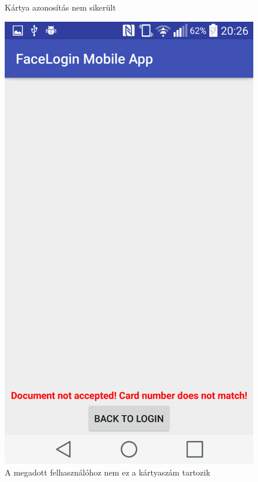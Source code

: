 \begin{figure}[h]
\begin{minipage}{.30\textwidth}
    \caption{Kártya azonosítás nem sikerült}
 \end{minipage}
 \begin{minipage}{.30\textwidth} 
\centering
     \includegraphics[scale=0.10]{img/card_number_does_not_match}
     \caption{A megadott felhasználóhoz nem ez a kártyaszám tartozik}
 \end{minipage}
 \begin{minipage}{.30\textwidth} 
\centering

\end{minipage}
\end{figure}
